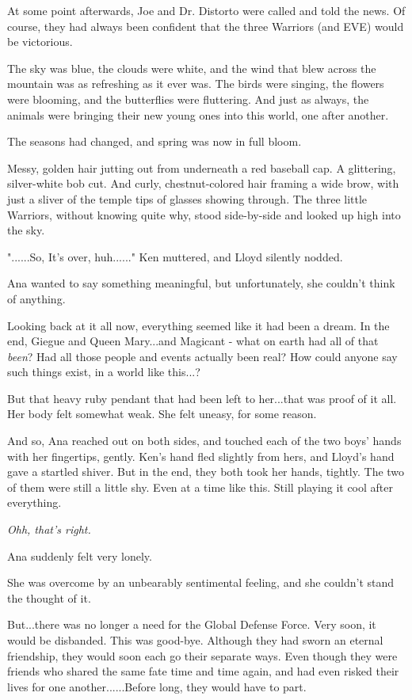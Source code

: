 \documentclass[
]{article}
\begin{document}
At some point afterwards, Joe and Dr. Distorto were called and told the
news. Of course, they had always been confident that the three Warriors
(and EVE) would be victorious.

The sky was blue, the clouds were white, and the wind that blew across
the mountain was as refreshing as it ever was. The birds were singing,
the flowers were blooming, and the butterflies were fluttering. And just
as always, the animals were bringing their new young ones into this
world, one after another.

The seasons had changed, and spring was now in full bloom.

Messy, golden hair jutting out from underneath a red baseball cap. A
glittering, silver-white bob cut. And curly, chestnut-colored hair
framing a wide brow, with just a sliver of the temple tips of glasses
showing through. The three little Warriors, without knowing quite why,
stood side-by-side and looked up high into the sky.

"......So, It's over, huh......" Ken muttered, and Lloyd silently
nodded.

Ana wanted to say something meaningful, but unfortunately, she couldn't
think of anything.

Looking back at it all now, everything seemed like it had been a dream.
In the end, Giegue and Queen Mary...and Magicant - what on earth had all
of that \emph{been}? Had all those people and events actually been real?
How could anyone say such things exist, in a world like this...?

But that heavy ruby pendant that had been left to her...that was proof
of it all. Her body felt somewhat weak. She felt uneasy, for some
reason.

And so, Ana reached out on both sides, and touched each of the two boys'
hands with her fingertips, gently. Ken's hand fled slightly from hers,
and Lloyd's hand gave a startled shiver. But in the end, they both took
her hands, tightly. The two of them were still a little shy. Even at a
time like this. Still playing it cool after everything.

\emph{Ohh, that's right.}

Ana suddenly felt very lonely.

She was overcome by an unbearably sentimental feeling, and she couldn't
stand the thought of it.

But...there was no longer a need for the Global Defense Force. Very
soon, it would be disbanded. This was good-bye. Although they had sworn
an eternal friendship, they would soon each go their separate ways. Even
though they were friends who shared the same fate time and time again,
and had even risked their lives for one another......Before long, they
would have to part.
\end{document}
